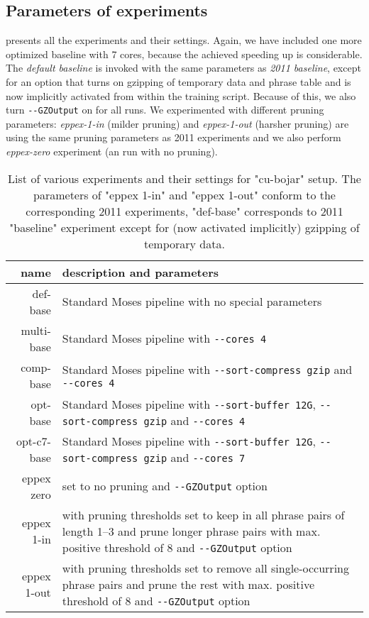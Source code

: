 \subsection{Parameters of experiments}

 presents all the experiments and their settings.
Again, we have included one more optimized baseline with 7 cores, because
the achieved speeding up is considerable.
The \emph{default baseline} is invoked with the same parameters as \emph{2011
baseline}, except for an option that turns on gzipping of temporary data and
phrase table and is now implicitly activated from within the training script.
Because of this, we also turn \verb|--GZOutput| on for all \eppex{} runs.
We experimented with different pruning parameters: \emph{eppex-1-in} (milder
pruning) and \emph{eppex-1-out} (harsher pruning) are using the same pruning
parameters as 2011 experiments and we also perform \emph{eppex-zero} experiment
(an \eppex{} run with no pruning).

\begin{table}[ht]
\centering
\begin{tabular}{ r p{10cm} }
name & description and parameters \\
\hline
\hline
def-base        & Standard Moses pipeline with no special parameters \\
multi-base      & Standard Moses pipeline with \verb|--cores 4| \\
comp-base       & Standard Moses pipeline with \verb|--sort-compress gzip|
  and \verb|--cores 4| \\
opt-base        & Standard Moses pipeline with \verb|--sort-buffer 12G|,
  \verb|--sort-compress gzip| and \verb|--cores 4| \\
opt-c7-base     & Standard Moses pipeline with \verb|--sort-buffer 12G|,
  \verb|--sort-compress gzip| and \verb|--cores 7| \\
eppex zero      & \eppex{} set to no pruning and \verb|--GZOutput| option \\
eppex 1-in      & \eppex{} with pruning thresholds set to keep in
  all phrase pairs of length 1--3 and prune longer phrase pairs
  with max. positive threshold of 8 and \verb|--GZOutput| option \\
eppex 1-out     & \eppex{} with pruning thresholds set to remove
  all single-occurring phrase pairs and prune the rest with
  max. positive threshold of 8 and \verb|--GZOutput| option \\
\hline
\hline
\end{tabular}
\caption{\label{cu-bojar-scenarios}List of various experiments and their
settings for "cu-bojar" setup. The parameters of "eppex 1-in" and "eppex 1-out"
conform to the corresponding 2011 experiments, "def-base" corresponds to 2011
"baseline" experiment except for (now activated implicitly) gzipping of
temporary data.}
\end{table}

